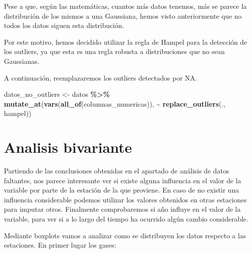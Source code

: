 \documentclass[notspecified,article,submit,moreauthors,pdftex]{Definitions/mdpi}
\newenvironment{Shaded}{\begin{snugshade}}{\end{snugshade}}
\newcommand{\FunctionTok}[1]{\textcolor[rgb]{0.13,0.29,0.53}{\textbf{#1}}}
\newcommand{\NormalTok}[1]{#1}
\newcommand{\OtherTok}[1]{\textcolor[rgb]{0.56,0.35,0.01}{#1}}
\newcommand{\SpecialCharTok}[1]{\textcolor[rgb]{0.81,0.36,0.00}{\textbf{#1}}}
\begin{document}
Pese a que, según las matemáticas, cuantos más datos tenemos, más se
parece la distribución de los mismos a una Gaussiana, hemos visto
anteriormente que no todos los datos siguen esta distribución.

Por este motivo, hemos decidido utilizar la regla de Hampel para la
detección de los outliers, ya que esta es una regla robusta a
distribuciones que no sean Gaussianas.

A continuación, reemplazaremos los outliers detectados por NA.

\begin{Shaded}
\begin{Highlighting}[]
\NormalTok{datos\_no\_outliers }\OtherTok{\textless{}{-}}\NormalTok{ datos }\SpecialCharTok{\%\textgreater{}\%}
  \FunctionTok{mutate\_at}\NormalTok{(}\FunctionTok{vars}\NormalTok{(}\FunctionTok{all\_of}\NormalTok{(columnas\_numericas)), }\SpecialCharTok{\textasciitilde{}} \FunctionTok{replace\_outliers}\NormalTok{(., hampel))}
\end{Highlighting}
\end{Shaded}

\hypertarget{analisis-bivariante}{%
\section{Analisis bivariante}\label{analisis-bivariante}}

Partiendo de las conclusiones obtenidas en el apartado de análisis de
datos faltantes, nos parece interesante ver si existe alguna influencia
en el valor de la variable por parte de la estación de la que proviene.
En caso de no existir una influencia considerable podemos utilizar los
valores obtenidos en otras estaciones para imputar otros. Finalmente
comprobaremos si año influye en el valor de la variable, para ver si a
lo largo del tiempo ha ocurrido algún cambio considerable.

Mediante boxplots vamos a analizar como se distribuyen los datos
respecto a las estaciones. En primer lugar los gases:
\end{document}
